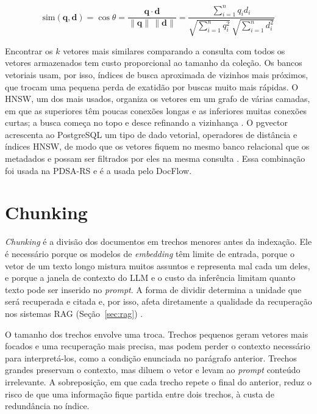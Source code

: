 \begin{equation}
	\label{eq:cosseno}
	\mathrm{sim}(\mathbf{q}, \mathbf{d}) = \cos\theta = \frac{\mathbf{q} \cdot \mathbf{d}}{\lVert \mathbf{q} \rVert \, \lVert \mathbf{d} \rVert} = \frac{\sum_{i=1}^{n} q_i d_i}{\sqrt{\sum_{i=1}^{n} q_i^2} \, \sqrt{\sum_{i=1}^{n} d_i^2}}
\end{equation}

Encontrar os $k$ vetores mais similares comparando a consulta com todos os vetores armazenados tem custo proporcional ao tamanho da coleção. Os bancos vetoriais usam, por isso, índices de busca aproximada de vizinhos mais próximos, que trocam uma pequena perda de exatidão por buscas muito mais rápidas. O HNSW, um dos mais usados, organiza os vetores em um grafo de várias camadas, em que as superiores têm poucas conexões longas e as inferiores muitas conexões curtas; a busca começa no topo e desce refinando a vizinhança \cite{Malkov2020}. O pgvector acrescenta ao PostgreSQL um tipo de dado vetorial, operadores de distância e índices HNSW, de modo que os vetores fiquem no mesmo banco relacional que os metadados e possam ser filtrados por eles na mesma consulta \cite{pgvector}. Essa combinação foi usada na PDSA-RS \cite{Montero2025} e é a usada pelo DocFlow.

\section{Chunking}
\label{sec:chunking}

\textit{Chunking} é a divisão dos documentos em trechos menores antes da indexação. Ele é necessário porque os modelos de \textit{embedding} têm limite de entrada, porque o vetor de um texto longo mistura muitos assuntos e representa mal cada um deles, e porque a janela de contexto do LLM e o custo da inferência limitam quanto texto pode ser inserido no \textit{prompt}. A forma de dividir determina a unidade que será recuperada e citada e, por isso, afeta diretamente a qualidade da recuperação nos sistemas RAG (Seção~\ref{sec:rag}) \cite{Gao2023}.

O tamanho dos trechos envolve uma troca. Trechos pequenos geram vetores mais focados e uma recuperação mais precisa, mas podem perder o contexto necessário para interpretá-los, como a condição enunciada no parágrafo anterior. Trechos grandes preservam o contexto, mas diluem o vetor e levam ao \textit{prompt} conteúdo irrelevante. A sobreposição, em que cada trecho repete o final do anterior, reduz o risco de que uma informação fique partida entre dois trechos, à custa de redundância no índice.

